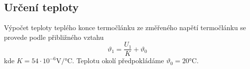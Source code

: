 \documentclass{article}
\begin{document}
\subsection{Určení teploty}
Výpočet teploty teplého konce termočlánku ze změřeného napětí termočlánku se provede podle přibližného vztahu
\begin{equation}
    \vartheta_1=\frac{U_1}{K}+\vartheta_0
\end{equation}
kde $K = 54 \cdot 10^{-6} \si{\volt\per\degreeCelsius}$. Teplotu okolí předpokládáme $\vartheta_0 = 20 \si{\degreeCelsius}$.
\end{document}
